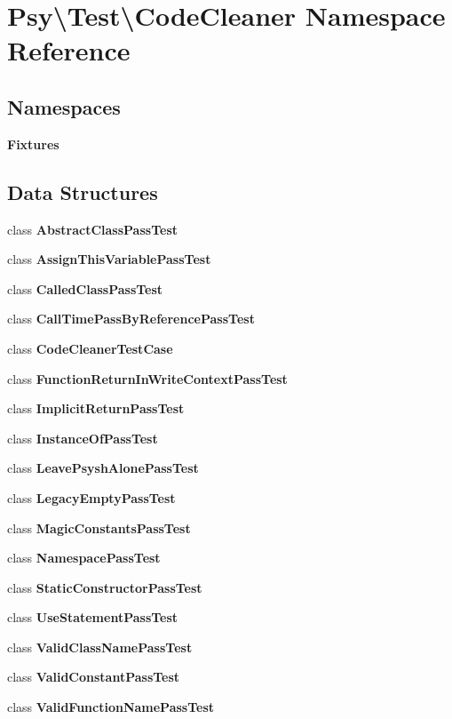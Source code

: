 \section{Psy\textbackslash{}Test\textbackslash{}Code\+Cleaner Namespace Reference}
\label{namespace_psy_1_1_test_1_1_code_cleaner}
\subsection*{Namespaces}
\begin{DoxyCompactItemize}
\item 
 {\bf Fixtures}
\end{DoxyCompactItemize}
\subsection*{Data Structures}
\begin{DoxyCompactItemize}
\item 
class {\bf Abstract\+Class\+Pass\+Test}
\item 
class {\bf Assign\+This\+Variable\+Pass\+Test}
\item 
class {\bf Called\+Class\+Pass\+Test}
\item 
class {\bf Call\+Time\+Pass\+By\+Reference\+Pass\+Test}
\item 
class {\bf Code\+Cleaner\+Test\+Case}
\item 
class {\bf Function\+Return\+In\+Write\+Context\+Pass\+Test}
\item 
class {\bf Implicit\+Return\+Pass\+Test}
\item 
class {\bf Instance\+Of\+Pass\+Test}
\item 
class {\bf Leave\+Psysh\+Alone\+Pass\+Test}
\item 
class {\bf Legacy\+Empty\+Pass\+Test}
\item 
class {\bf Magic\+Constants\+Pass\+Test}
\item 
class {\bf Namespace\+Pass\+Test}
\item 
class {\bf Static\+Constructor\+Pass\+Test}
\item 
class {\bf Use\+Statement\+Pass\+Test}
\item 
class {\bf Valid\+Class\+Name\+Pass\+Test}
\item 
class {\bf Valid\+Constant\+Pass\+Test}
\item 
class {\bf Valid\+Function\+Name\+Pass\+Test}
\end{DoxyCompactItemize}
